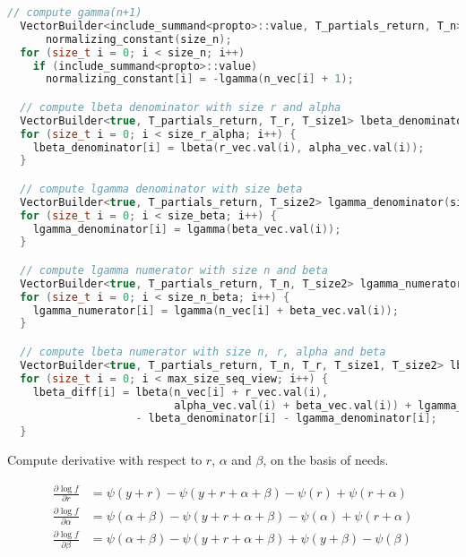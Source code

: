 \documentclass[11pt]{article}
\begin{document}
\begin{lstlisting}[language=c++, style=lgeneral]
  // compute gamma(n+1)
  VectorBuilder<include_summand<propto>::value, T_partials_return, T_n>
      normalizing_constant(size_n);
  for (size_t i = 0; i < size_n; i++)
    if (include_summand<propto>::value)
      normalizing_constant[i] = -lgamma(n_vec[i] + 1);

  // compute lbeta denominator with size r and alpha
  VectorBuilder<true, T_partials_return, T_r, T_size1> lbeta_denominator(size_r_alpha);
  for (size_t i = 0; i < size_r_alpha; i++) {
    lbeta_denominator[i] = lbeta(r_vec.val(i), alpha_vec.val(i));
  }

  // compute lgamma denominator with size beta
  VectorBuilder<true, T_partials_return, T_size2> lgamma_denominator(size_beta);
  for (size_t i = 0; i < size_beta; i++) {
    lgamma_denominator[i] = lgamma(beta_vec.val(i));
  }

  // compute lgamma numerator with size n and beta
  VectorBuilder<true, T_partials_return, T_n, T_size2> lgamma_numerator(size_n_beta);
  for (size_t i = 0; i < size_n_beta; i++) {
    lgamma_numerator[i] = lgamma(n_vec[i] + beta_vec.val(i));
  }

  // compute lbeta numerator with size n, r, alpha and beta
  VectorBuilder<true, T_partials_return, T_n, T_r, T_size1, T_size2> lbeta_diff(max_size_seq_view);
  for (size_t i = 0; i < max_size_seq_view; i++) {
    lbeta_diff[i] = lbeta(n_vec[i] + r_vec.val(i),
                          alpha_vec.val(i) + beta_vec.val(i)) + lgamma_numerator[i]
                    - lbeta_denominator[i] - lgamma_denominator[i];
  }
\end{lstlisting}



Compute derivative with respect to $r$, $\alpha$ and $\beta$, on the basis of needs.

\begin{equation}
  \begin{aligned}
\frac{\partial \log f}{\partial r} &= \psi(y+r) - \psi(y+r+\alpha+\beta) - \psi(r) + \psi(r+\alpha) \\
\frac{\partial \log f}{\partial \alpha} &= \psi(\alpha+\beta) - \psi(y+r+\alpha+\beta) - \psi(\alpha) + \psi(r+\alpha) \\
\frac{\partial \log f}{\partial \beta} &= \psi(\alpha+\beta) - \psi(y+r+\alpha+\beta) + \psi(y+\beta) - \psi(\beta)
  \end{aligned}
\end{equation}
\end{document}
